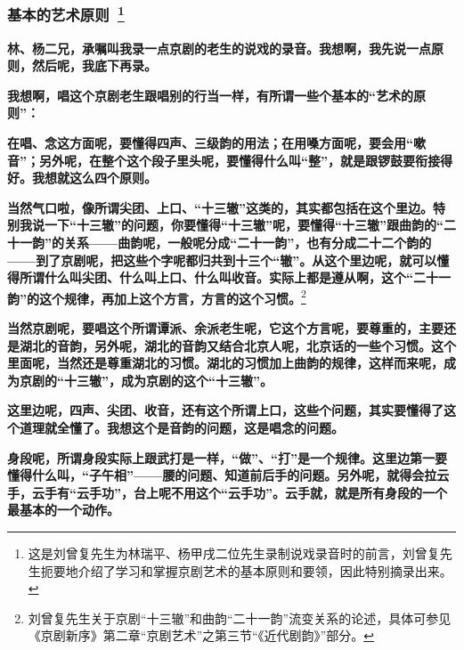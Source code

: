 \newpage
{}
\pagestyle{fancy}    %

\subsubsection{{\hei \large 基本的艺术原则}~\protect\footnote{这是刘曾复先生为林瑞平、杨甲戌二位先生录制说戏录音时的前言，刘曾复先生扼要地介绍了学习和掌握京剧艺术的基本原则和要领，因此特别摘录出来。%
}}%

\textbf{林、杨二兄，承嘱叫我录一点京剧的老生的说戏的录音。我想啊，我先说一点原则，然后呢，我底下再录。}

\textbf{我想啊，唱这个京剧老生跟唱别的行当一样，有所谓一些个基本的``艺术的原则''：}

\textbf{在唱、念这方面呢，要懂得四声、三级韵的用法；在用嗓方面呢，要会用``嗽音''；另外呢，在整个这个段子里头呢，要懂得什么叫``整''，就是跟锣鼓要衔接得好。我想就这么四个原则。}

\textbf{当然气口啦，像所谓尖团、上口、``十三辙''这类的，其实都包括在这个里边。特别我说一下``十三辙''的问题，你要懂得``十三辙''呢，要懂得``十三辙''跟曲韵的``二十一韵''的关系------曲韵呢，一般呢分成``二十一韵''，也有分成二十二个韵的------到了京剧呢，把这些个字呢都归共到十三个``辙''。从这个里边呢，就可以懂得所谓什么叫尖团、什么叫上口、什么叫收音。实际上都是遵从啊，这个``二十一韵''的这个规律，再加上这个方言，方言的这个习惯。}\footnote{刘曾复先生关于京剧``十三辙''和曲韵``二十一韵''流变关系的论述，具体可参见《京剧新序》第二章``京剧艺术''之第三节``《近代剧韵》''部分。%
}

\textbf{当然京剧呢，要唱这个所谓谭派、余派老生呢，它这个方言呢，要尊重的，主要还是湖北的音韵，另外呢，湖北的音韵又结合北京人呢，北京话的一些个习惯。这个里面呢，当然还是尊重湖北的习惯。湖北的习惯加上曲韵的规律，这样而来呢，成为京剧的``十三辙''，成为京剧的这个``十三辙''。}

\textbf{这里边呢，四声、尖团、收音，还有这个所谓上口，这些个问题，其实要懂得了这个道理就全懂了。我想这个是音韵的问题，这是唱念的问题。}

\textbf{身段呢，所谓身段实际上跟武打是一样，``做''、``打''是一个规律。这里边第一要懂得什么叫，``子午相''------腰的问题、知道前后手的问题。另外呢，就得会拉云手，云手有``云手功''，台上呢不用这个``云手功''。云手就，就是所有身段的一个最基本的一个动作。}

